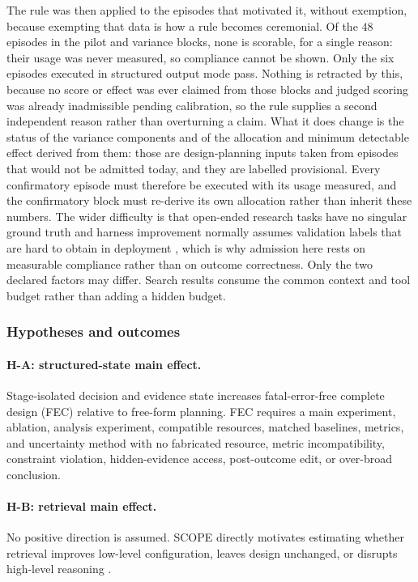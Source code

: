\documentclass[11pt,a4paper]{article}
\begin{document}
The rule was then applied to the episodes that motivated it, without exemption, because
exempting that data is how a rule becomes ceremonial. Of the $48$ episodes in the pilot
and variance blocks, none is scorable, for a single reason: their usage was never
measured, so compliance cannot be shown. Only the six episodes executed in structured
output mode pass. Nothing is retracted by this, because no score or effect was ever
claimed from those blocks and judged scoring was already inadmissible pending
calibration, so the rule supplies a second independent reason rather than overturning a
claim. What it does change is the status of the variance components and of the allocation
and minimum detectable effect derived from them: those are design-planning inputs taken
from episodes that would not be admitted today, and they are labelled provisional. Every
confirmatory episode must therefore be executed with its usage measured, and the
confirmatory block must re-derive its own allocation rather than inherit these numbers.
The wider difficulty is that open-ended research tasks have no singular ground truth
\citep{openendedgroundtruth2026} and harness improvement normally assumes validation
labels that are hard to obtain in deployment \citep{harnesslabels2026}, which is why
admission here rests on measurable compliance rather than on outcome correctness.  Only the two declared factors may differ.  Search results consume
the common context and tool budget rather than adding a hidden budget.

\subsubsection{Hypotheses and outcomes}

\paragraph{H-A: structured-state main effect.}
Stage-isolated decision and evidence state increases fatal-error-free complete
design (FEC) relative to free-form planning.  FEC requires a main experiment,
ablation, analysis experiment, compatible resources, matched baselines, metrics,
and uncertainty method with no fabricated resource, metric incompatibility,
constraint violation, hidden-evidence access, post-outcome edit, or over-broad
conclusion.

\paragraph{H-B: retrieval main effect.}
No positive direction is assumed.  SCOPE directly motivates estimating whether
retrieval improves low-level configuration, leaves design unchanged, or disrupts
high-level reasoning \citep{scope2026}.
\end{document}
